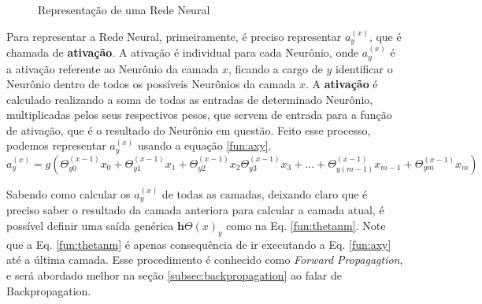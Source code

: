 \begin{figure}
\caption{Representação de uma Rede Neural}
\label{fg:rede_neural_generica}
\end{figure}


Para representar a Rede Neural, primeiramente, é preciso  representar $a^{(x)}_y$, que é chamada de \textbf{ativação}. A ativação é individual para cada Neurônio, onde $a^{(x)}_y$ é a ativação referente ao Neurônio da camada $x$, ficando a cargo de $y$ identificar o Neurônio dentro de todos os possíveis Neurônios da camada $x$. A \textbf{ativação} é calculado realizando a soma de todas as entradas de determinado Neurônio, multiplicadas pelos seus respectivos pesos, que servem de entrada para a função de ativação, que é o resultado do Neurônio em questão. Feito esse processo, podemos representar $a^{(x)}_y$ usando a equação \ref{fun:axy}.
\begin{equation}
    a^{(x)}_y=g(\Theta^{(x-1)}_{y0}x{}_0+\Theta^{(x-1)}_{y1}x{}_1+\Theta^{(x-1)}_{y2}x{}_2\Theta^{(x-1)}_{y3}x{}_3+...+\Theta^{(x-1)}_{y(m-1)}x{}_{m-1}+\Theta^{(x-1)}_{ym}x{}_m )
    \label{fun:axy}
\end{equation}


Sabendo como calcular os $a^{(x)}_y$ de todas as camadas, deixando claro que é preciso saber o resultado da camada anteriora para calcular a camada atual, é possível definir uma saída genérica $\mathbf{h}{\Theta}(x)_y$ como na  Eq. \ref{fun:thetanm}. Note que a Eq. \ref{fun:thetanm} é apenas consequência de ir executando a Eq.  \ref{fun:axy} até a última camada. Esse procedimento é conhecido como \textit{Forward Propagagtion}, e será abordado melhor na seção \ref{subsec:backpropagation} ao falar de Backpropagation.

